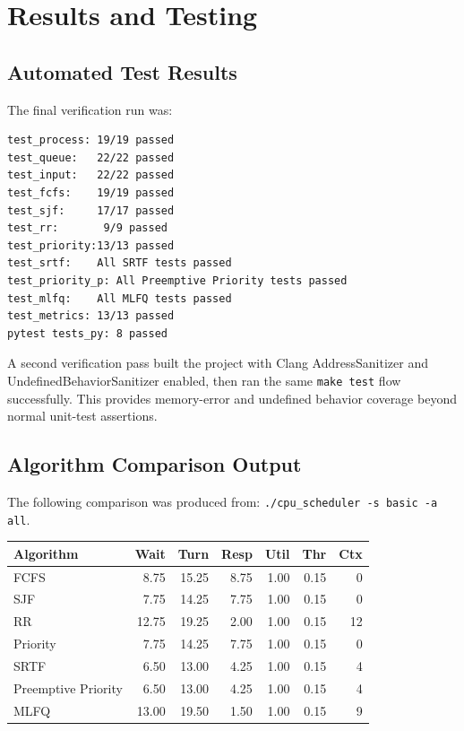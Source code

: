 \documentclass[11pt]{article}
\begin{document}
\section{Results and Testing}
\label{sec:results}

\subsection{Automated Test Results}

The final verification run was:

\begin{lstlisting}[style=terminal,caption={Final command: make test}]
test_process: 19/19 passed
test_queue:   22/22 passed
test_input:   22/22 passed
test_fcfs:    19/19 passed
test_sjf:     17/17 passed
test_rr:       9/9 passed
test_priority:13/13 passed
test_srtf:    All SRTF tests passed
test_priority_p: All Preemptive Priority tests passed
test_mlfq:    All MLFQ tests passed
test_metrics: 13/13 passed
pytest tests_py: 8 passed
\end{lstlisting}

A second verification pass built the project with Clang
AddressSanitizer and UndefinedBehaviorSanitizer enabled, then ran the same
\texttt{make test} flow successfully. This provides memory-error and undefined
behavior coverage beyond normal unit-test assertions.

\subsection{Algorithm Comparison Output}

The following comparison was produced from:
\texttt{./cpu\_scheduler -s basic -a all}.

\begin{center}
\begin{tabular}{lrrrrrr}
\toprule
\textbf{Algorithm} & \textbf{Wait} & \textbf{Turn} & \textbf{Resp} &
\textbf{Util} & \textbf{Thr} & \textbf{Ctx} \\
\midrule
FCFS & 8.75 & 15.25 & 8.75 & 1.00 & 0.15 & 0 \\
SJF & 7.75 & 14.25 & 7.75 & 1.00 & 0.15 & 0 \\
RR & 12.75 & 19.25 & 2.00 & 1.00 & 0.15 & 12 \\
Priority & 7.75 & 14.25 & 7.75 & 1.00 & 0.15 & 0 \\
SRTF & 6.50 & 13.00 & 4.25 & 1.00 & 0.15 & 4 \\
Preemptive Priority & 6.50 & 13.00 & 4.25 & 1.00 & 0.15 & 4 \\
MLFQ & 13.00 & 19.50 & 1.50 & 1.00 & 0.15 & 9 \\
\bottomrule
\end{tabular}
\end{center}
\end{document}
